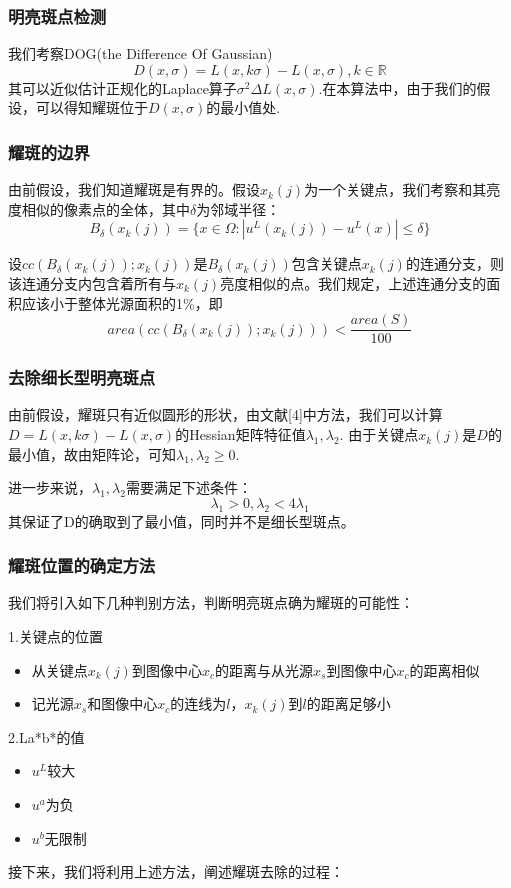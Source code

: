 \documentclass{beamer}
\begin{document}
\begin{frame}
\frametitle{明亮斑点检测}
我们考察DOG(the Difference Of Gaussian)
\begin{equation}
D(x,\sigma)=L(x,k\sigma)-L(x,\sigma),k\in \mathbb{R}
\end{equation}\pause
其可以近似估计正规化的Laplace算子$
\sigma^2\Delta L(x,\sigma)$.在本算法中，由于我们的假设，可以得知耀斑位于$D(x,\sigma)$的最小值处.
\end{frame}
\begin{frame}
\frametitle{耀斑的边界}

由前假设，我们知道耀斑是有界的。假设$x_k(j)$为一个关键点，我们考察和其亮度相似的像素点的全体，其中$\delta$为邻域半径：
\begin{equation}
B_{\delta}(x_k(j))=\{x\in \Omega: |u^L(x_k(j))-u^L(x)|\leq \delta\}
\end{equation}\pause

设$cc(B_{\delta}(x_k(j));x_k(j))$是$B_{\delta}(x_k(j))$包含关键点$x_k(j)$的连通分支，则该连通分支内包含着所有与$x_k(j)$亮度相似的点。我们规定，上述连通分支的面积应该小于整体光源面积的1\%，即
\begin{equation}
area(cc(B_{\delta}(x_k(j));x_k(j)))<\frac{area(S)}{100}
\end{equation}
\end{frame}
\begin{frame}
\frametitle{去除细长型明亮斑点}
由前假设，耀斑只有近似圆形的形状，由文献[4]中方法，我们可以计算$D=L(x,k\sigma)-L(x,\sigma)$的Hessian矩阵特征值$\lambda_1,\lambda_2$. \pause
由于关键点$x_k(j)$是$D$的最小值，故由矩阵论，可知$\lambda_1,\lambda_2\geq 0$. \pause

进一步来说，$\lambda_1,\lambda_2$需要满足下述条件：
\begin{equation}
{\lambda}_1>0,{\lambda}_2<4{\lambda}_1
\end{equation}
其保证了D的确取到了最小值，同时并不是细长型斑点。\end{frame}
\begin{frame}
\frametitle{耀斑位置的确定方法}
我们将引入如下几种判别方法，判断明亮斑点确为耀斑的可能性：

1.关键点的位置
\begin{itemize}
\item 从关键点$x_k(j)$到图像中心$x_c$的距离与从光源$x_s$到图像中心$x_c$的距离相似\pause

\item 记光源$x_s$和图像中心$x_c$的连线为$l$，$x_k(j)$到$l$的距离足够小\pause
\end{itemize}
2.La*b*的值
\begin{itemize}
\item $u^L$较大
\item $u^a$为负
\item$u^b$无限制\pause
\end{itemize}
接下来，我们将利用上述方法，阐述耀斑去除的过程：
\end{frame}
\end{document}
